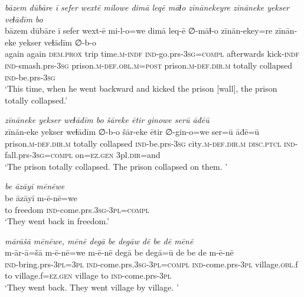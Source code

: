 \ea \label{BP.173}
\textit{bāzem dūbāre ī sefer wextē milowe dimā leqē māɫo zīnānekeyre zīnāneke yekser veɫādīm bo} \\ 
\gll bāzem dūbāre ī sefer wext-ē mi-l-o=we dimā leq-ē ∅-māɫ-o zīnān-ekey=re zīnān-eke yekser veɫādīm ∅-b-o \\ 
 again again \textsc{dem.prox} trip time\textsc{.m}\textsc{-indf} \textsc{ind-}go.prs\textsc{-3sg}\textsc{=compl} afterwards kick\textsc{-indf} \textsc{ind-}smash.prs\textsc{-3sg} prison\textsc{.m}\textsc{-def}\textsc{.obl}\textsc{.m}\textsc{=\textsc{post}} prison\textsc{.m}\textsc{-def}\textsc{.dir}\textsc{.m} totally collapsed \textsc{ind-}be.prs\textsc{-3sg} \\ 
\glt `This time, when he went backward and kicked the prison [wall], the prison totally collapsed.'
\z 
 
\ea \label{BP.174}
\textit{zīnāneke yekser weɫādīm bo šāreke ētir ginowe serū āđēū} \\ 
\gll zīnān-eke yekser weɫādīm ∅-b-o šār-eke ētir ∅-gin-o=we ser=ū āđē=ū \\ 
 prison\textsc{.m}\textsc{-def}\textsc{.dir}\textsc{.m} totally collapsed \textsc{ind-}be.prs\textsc{-3sg} city\textsc{.m}\textsc{-def}\textsc{.dir}\textsc{.m} \textsc{disc.ptcl} \textsc{ind-}fall.prs\textsc{-3sg}\textsc{=compl} on\textsc{=ez.gen} 3pl\textsc{.dir}=and \\ 
\glt `The prison totally collapsed. The prison collapsed on them. '
\z 
 
\ea \label{BP.176}
\textit{be āzāyī mēnēwe} \\ 
\gll be āzāyī m-ē-nē=we \\ 
 to freedom \textsc{ind-}come.prs\textsc{.3sg}\textsc{-3pl}\textsc{=compl} \\ 
\glt `They went back in freedom.'
\z 
 
\ea \label{BP.177}
\textit{mārāšā mēnēwe, mēnē degā be degāw dē be dē mēnē} \\ 
\gll m-ār-ā=šā m-ē-nē=we m-ē-nē degā be degā=ū de be de m-ē-nē \\ 
 \textsc{ind-}bring.prs\textsc{-3pl}\textsc{=3pl} \textsc{ind-}come.prs\textsc{.3sg}\textsc{-3pl}\textsc{=compl} \textsc{ind-}come.prs\textsc{-3pl} village\textsc{.obl}.f to village.f\textsc{=ez.gen} village to \textsc{ind-}come.prs\textsc{-3pl} \\ 
\glt `They went back. They went village by village. '
\z 
 
